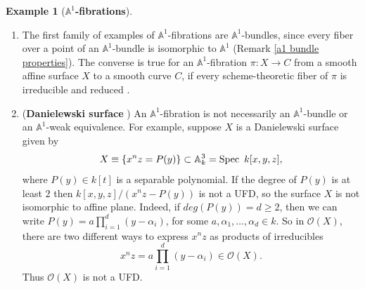 \documentclass[11pt, reqno]{amsart}
\theoremstyle{plain}
\theoremstyle{definition}
\newtheorem{example}[thm]{Example}
\newcommand{\Spec}{{\rm Spec \,}}
\newcommand{\sO}{{\mathcal O}}
\newcommand{\A}{{\mathbb A}}
\begin{document}
	\begin{example} [\textbf{$\mathbb{A}^1$-fibrations}]\label{d-sphere}\hfill
    \begin{enumerate}
        \item The first family of examples of $\mathbb{A}^1$-fibrations are $\mathbb{A}^1$-bundles, since every fiber over a point of an $\mathbb{A}^1$-bundle
         is isomorphic to $\mathbb{A}^1$ (Remark \ref{a1 bundle properties}).
The converse is true for an $\A^1$-fibration $\pi: X \to C$ from a smooth affine surface $X$ to a smooth curve $C$, if every scheme-theoretic fiber of $\pi$ is irreducible and reduced \cite[Proposition 3]{doub}.
        \item (\textbf{Danielewski surface} \cite[Chapter 5, Section 5.3.4]{as}) An $\A^1$-fibration is not necessarily an $\A^1$-bundle or an $\A^1$-weak equivalence. %
For example, suppose $X$ is a Danielewski surface given by
$$X \equiv \{x^nz=P(y)\} \subset \mathbb{A}^3_k = \Spec\ k[x,y,z],$$ 
where $P(y) \in k[t]$ is a separable polynomial.
If the degree of $P(y)$ is at least $2$ then $k[x,y,z]/(x^nz-P(y))$ is not a UFD, so the surface $X$ is not isomorphic to affine plane. Indeed, if $deg(P(y))=d \geq 2$, then we can write $P(y) = a \prod_{i=1}^{d}(y - \alpha_i)$, for some $a, \alpha_1, \dots, \alpha_d \in k$. So in $\sO(X)$, there are two different ways to express $x^nz$ as products of irreducibles
$$x^nz = a \prod_{i=1}^{d}(y - \alpha_i) \in \sO(X).$$
Thus $\sO(X)$ is not a UFD.


\end{enumerate}
\end{example}
\end{document}

